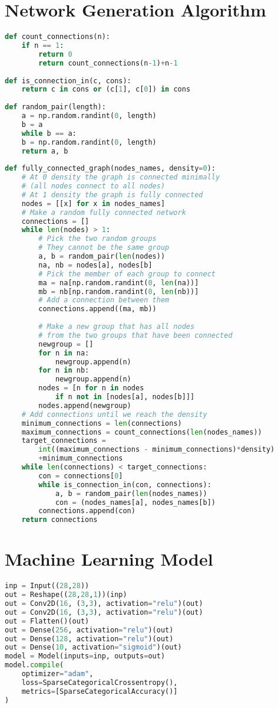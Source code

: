 \appendix
\chapter{Network Generation Algorithm}
\begin{lstlisting}[language=Python]
def count_connections(n):
	if n == 1:
		return 0
		return count_connections(n-1)+n-1
		
def is_connection_in(c, cons):
	return c in cons or (c[1], c[0]) in cons
	
def random_pair(length):
	a = np.random.randint(0, length)
	b = a
	while b == a:
	b = np.random.randint(0, length)
	return a, b
	
def fully_connected_graph(nodes_names, density=0):
	# At 0 density the graph is connected minimally
	# (all nodes connect to all nodes)
	# At 1 density the graph is fully connected
	nodes = [[x] for x in nodes_names]
	# Make a random fully connected network
	connections = []
	while len(nodes) > 1:
		# Pick the two random groups
		# They cannot be the same group
		a, b = random_pair(len(nodes))
		na, nb = nodes[a], nodes[b]
		# Pick the member of each group to connect
		ma = na[np.random.randint(0, len(na))]
		mb = nb[np.random.randint(0, len(nb))]
		# Add a connection between them
		connections.append((ma, mb))
		
		# Make a new group that has all nodes
		# from the two groups that have been connected
		newgroup = []
		for n in na:
			newgroup.append(n)
		for n in nb:
			newgroup.append(n)
		nodes = [n for n in nodes
			if n not in [nodes[a], nodes[b]]]
		nodes.append(newgroup)
	# Add connections until we reach the density
	minimum_connections = len(connections)
	maximum_connections = count_connections(len(nodes_names))
	target_connections = 
		int((maximum_connections - minimum_connections)*density)
		+minimum_connections
	while len(connections) < target_connections:
		con = connections[0]
		while is_connection_in(con, connections):
			a, b = random_pair(len(nodes_names))
			con = (nodes_names[a], nodes_names[b])
		connections.append(con)
	return connections
\end{lstlisting}


\chapter{Machine Learning Model} \label{ap:model}
\begin{lstlisting}[language=Python]
inp = Input((28,28))
out = Reshape((28,28,1))(inp)
out = Conv2D(16, (3,3), activation="relu")(out)
out = Conv2D(16, (3,3), activation="relu")(out)
out = Flatten()(out)
out = Dense(256, activation="relu")(out)
out = Dense(128, activation="relu")(out)
out = Dense(10, activation="sigmoid")(out)
model = Model(inputs=inp, outputs=out)
model.compile(
	optimizer="adam",
	loss=SparseCategoricalCrossentropy(),
	metrics=[SparseCategoricalAccuracy()]
)
\end{lstlisting}

